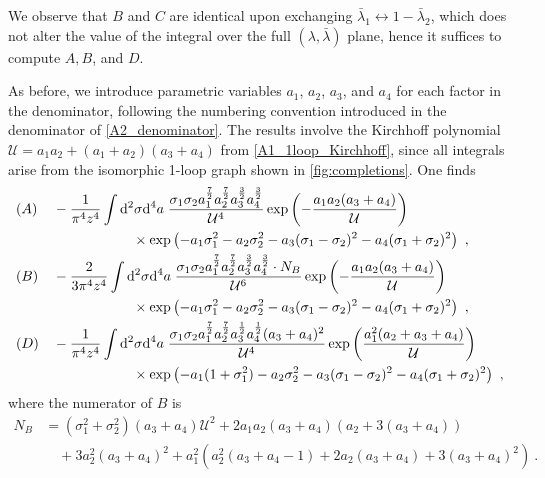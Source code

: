 \documentclass[11pt]{amsart}
\numberwithin{equation}{section}
\numberwithin{figure}{section}
\numberwithin{table}{section}
\begin{document}
We observe that $B$ and $C$ are identical upon exchanging $\bar \lambda_1 \leftrightarrow 1- \bar \lambda_2$, which does not alter the value of the integral over the full $(\lambda,\bar \lambda)$ plane, hence it suffices to compute $A,B$, and $D$.  

As before, we introduce parametric variables $a_1$, $a_2$, $a_3$, and $a_4$ for each factor in the denominator, following the numbering convention introduced in the denominator of \cref{A2_denominator}.
The results involve the  Kirchhoff polynomial $\mathcal U = a_1 a_2  + (a_1+a_2)( a_3+a_4)$ from \cref{A1_1loop_Kirchhoff}, since all integrals arise from the isomorphic 1-loop graph shown in \cref{fig:completions}.
One finds
\begin{align*}
&(A) &	&-\frac{1}{\pi^4 z^4} \int \mathrm{d}^2 \sigma \mathrm{d}^4 a \; \frac{\sigma_1 \sigma_2 a_1^{\frac 7 2} a_2^{\frac 7 2}  a_3^{\frac 3 2} a_4^{\frac 32} }{\mathcal U^4} \exp \left( -\frac{a_1 a_2(a_3+a_4)}{\mathcal U} \right) \\
	&&&\hspace{2cm} \times \exp \left(  -a_1 \sigma_1^2 - a_2 \sigma_2^2 - a_3 (\sigma_1-\sigma_2)^2 -a_4 (\sigma_1+\sigma_2)^2  \right)~, \\
	&(B)&	&-\frac{2}{3\pi^4 z^4} \int \mathrm{d}^2 \sigma \mathrm{d}^4 a \; \frac{\sigma_1 \sigma_2 a_1^{\frac 7 2} a_2^{\frac 7 2}  a_3^{\frac 3 2} a_4^{\frac 32} \cdot N_B}{\mathcal U^6} \exp \left( -\frac{a_1 a_2(a_3+a_4)}{\mathcal U} \right) \\
	&&&\hspace{2cm}  \times \exp \left(  -a_1 \sigma_1^2 - a_2 \sigma_2^2 - a_3 (\sigma_1-\sigma_2)^2 -a_4 (\sigma_1+\sigma_2)^2  \right)~ , \\
	 &(D) &	&-\frac{1}{\pi^4 z^4}\int \mathrm{d}^2 \sigma \mathrm{d}^4 a \; \frac{\sigma_1 \sigma_2 a_1^{\frac 72} a_2^{\frac 72} a_3^{\frac 12} a_4^{\frac 12} (a_3+a_4)^2}{\mathcal U^4} \exp \left( \frac{a_1^2(a_2+a_3+a_4)}{\mathcal U} \right) \\
	&&	&\hspace{2cm}  \times \exp \left( -a_1(1+\sigma_1^2) - a_2 \sigma_2^2 - a_3(\sigma_1-\sigma_2)^2 - a_4(\sigma_1+\sigma_2)^2  \right)~ ,
\end{align*} 
where the numerator of $B$ is
\begin{align*}
	N_B &= (\sigma_1^2+\sigma_2^2)(a_3+a_4) \mathcal U^2  + 2 a_1 a_2 (a_3+a_4)(a_2+3(a_3+a_4))\\
	&\quad + 3 a_2^2(a_3+a_4)^2 +a_1^2(a_2^2(a_3+a_4-1)+2 a_2(a_3+a_4)+3(a_3+a_4)^2)~.
\end{align*} 
\end{document}
